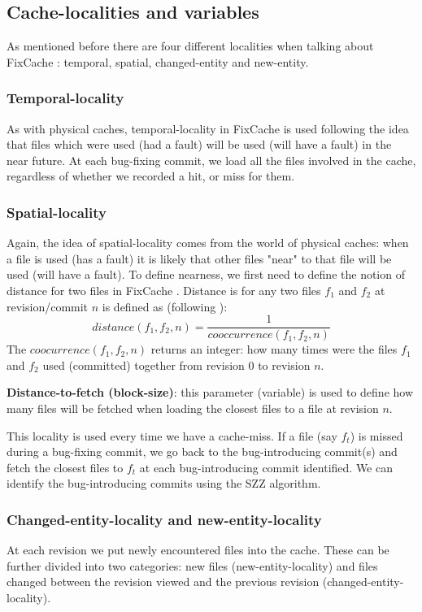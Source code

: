 \documentclass[12pt,twoside,notitlepage]{report}
\newcommand{\fxch}{FixCache }
\begin{document}
\subsection{Cache-localities and variables}
As mentioned before there are four different localities when talking about \fxch: temporal, spatial, changed-entity and new-entity. 
\subsubsection{Temporal-locality}
As with physical caches, temporal-locality in \fxch is used following the idea that files which were used (had a fault) will be used (will have a fault) in the near future. At each bug-fixing commit, we load all the files involved in the cache, regardless of whether we recorded a hit, or miss for them.
\subsubsection{Spatial-locality}
Again, the idea of spatial-locality comes from the world of physical caches: when a file is used (has a fault) it is likely that other files "near" to that file will be used (will have a fault). To define nearness, we first need to define the notion of distance for two files in \fxch. Distance is for any two files $f_1$ and $f_2$ at revision/commit $n$ is defined as (following \cite{FixCache}):
\[
	distance(f_1, f_2, n) = \frac{1}{cooccurrence(f_1, f_2, n)}
\]
The $coocurrence(f_1, f_2, n)$ returns an integer: how many times were the files $f_1$ and $f_2$ used (committed) together from revision $0$ to revision $n$.

\textbf{Distance-to-fetch (block-size)}: this parameter (variable) is used to define how many files will be fetched when loading the closest files to a file at revision $n$.

This locality is used every time we have a cache-miss. If a file (say $f_t$) is missed during a bug-fixing commit, we go back to the bug-introducing commit(s) and fetch the closest files to $f_t$ at each bug-introducing commit identified. We can identify the bug-introducing commits using the SZZ algorithm\cite{SZZ}.
\subsubsection{Changed-entity-locality and new-entity-locality}
At each revision we put newly encountered files into the cache. These can be further divided into two categories: new files (new-entity-locality) and files changed between the revision viewed and the previous revision (changed-entity-locality). 
\end{document}
